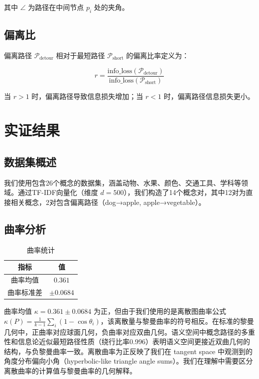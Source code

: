 \documentclass[
 UTF8,
 fontset=mac,
]{ctexart}
\begin{document}
其中 $\angle$ 为路径在中间节点 $p_i$ 处的夹角。

\subsection{偏离比}\label{detour-ratio}

偏离路径 $\mathcal{P}_{\text{detour}}$ 相对于最短路径 $\mathcal{P}_{\text{short}}$ 的偏离比率定义为：

\begin{equation}
r = \frac{\text{info\_loss}(\mathcal{P}_{\text{detour}})}{\text{info\_loss}(\mathcal{P}_{\text{short}})}
\end{equation}

当 $r > 1$ 时，偏离路径导致信息损失增加；当 $r < 1$ 时，偏离路径信息损失更小。

\section{实证结果}\label{results}

\subsection{数据集概述}\label{dataset}

我们使用包含26个概念的数据集，涵盖动物、水果、颜色、交通工具、学科等领域。通过TF-IDF向量化（维度 $d=500$），我们构造了14个概念对，其中12对为直接相关概念，2对包含偏离路径（dog→apple, apple→vegetable）。

\subsection{曲率分析}\label{curvature-results}

\begin{table}[htbp]
\centering
\caption{曲率统计}
\begin{tabular}{cc}
\toprule
指标 & 值 \\
\midrule
曲率均值 & $0.361$ \\
曲率标准差 & $\pm 0.0684$ \\
\bottomrule
\end{tabular}
\end{table}

曲率均值 $\kappa = 0.361 \pm 0.0684$ 为正，但由于我们使用的是离散图曲率公式 $\kappa(P) = \frac{1}{k-1}\sum_i(1-\cos\theta_i)$，该离散量与黎曼曲率的符号相反。在标准的黎曼几何中，正曲率对应球面几何，负曲率对应双曲几何。语义空间中概念路径的多重性和信息论近似最短路径性质（绕行比率0.996）表明语义空间更接近双曲几何的结构，与负黎曼曲率一致。离散曲率为正反映了我们在 tangent space 中观测到的角度分布偏向小角（hyperbolic-like triangle angle sums）。我们在理解中需要区分离散曲率的计算值与黎曼曲率的几何解释。
\end{document}
